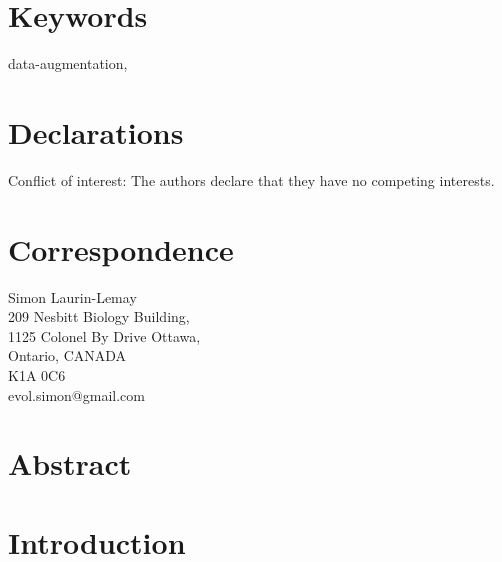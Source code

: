 \documentclass{article}
\begin{document}
\title{}
\author[1]{Simon Laurin-Lemay}
\author[1,2,3]{Nicolas Rodrigue}
\date{}
\maketitle

\section*{Keywords}
data-augmentation,
\section*{Declarations}
Conflict of interest: The authors declare that they have no competing
interests.
\section*{Correspondence}
Simon Laurin-Lemay\\
209 Nesbitt Biology Building,\\
1125 Colonel By Drive Ottawa,\\
Ontario, CANADA\\
K1A 0C6\\
evol.simon@gmail.com\\
\clearpage
\doublespacing

% 

\section*{Abstract}


\linenumbers
\section*{Introduction}


% 
\end{document}
